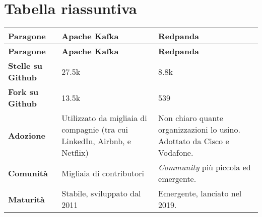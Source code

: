 \section{Tabella riassuntiva}
\begin{longtable}{|p{4cm}||p{5.5cm}|p{5.5cm}|}
	\hline
	\textbf{Paragone}                         & \textbf{Apache Kafka}                                                         & \textbf{Redpanda}                                                                                                                                                                \\
	\hline
	\endfirsthead
	\hline
	\textbf{Paragone}                         & \textbf{Apache Kafka}                                                         & \textbf{Redpanda}                                                                                                                                                                \\
	\hline
	\textbf{Stelle su Github}                 & 27.5k                                                                         & 8.8k                                                                                                                                                                             \\
	\hline
	\textbf{Fork su Github}                   & 13.5k                                                                         & 539                                                                                                                                                                              \\
	\hline
	\textbf{Adozione}                         & Utilizzato da migliaia di compagnie (tra cui LinkedIn, Airbnb, e Netflix)     & Non chiaro quante organizzazioni lo usino. Adottato da Cisco e Vodafone.                                                                                                         \\
	\hline
	\textbf{Comunità}                         & Migliaia di contributori                                                      & \textit{Community} più piccola                                        ed emergente.                                                                                              \\
	\hline
	\textbf{Maturità}                         & Stabile, sviluppato dal 2011                                                  & Emergente, lanciato nel 2019.                                                                                                                                                    \\

\end{longtable}
